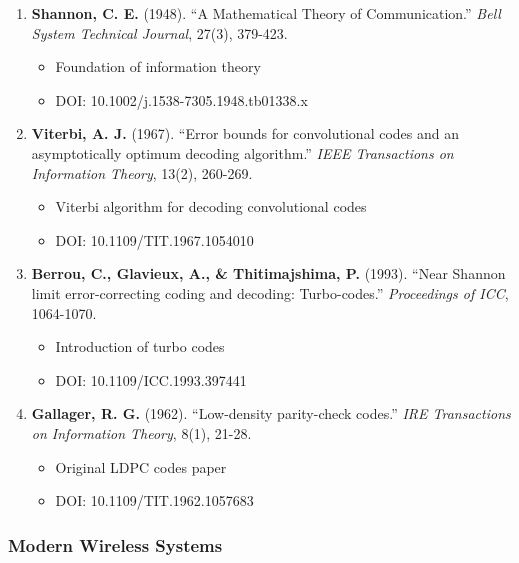 \begin{enumerate}
\def\labelenumi{\arabic{enumi}.}
\setcounter{enumi}{16}
\tightlist
\item
  \textbf{Shannon, C. E.} (1948). ``A Mathematical Theory of
  Communication.'' \emph{Bell System Technical Journal}, 27(3), 379-423.

  \begin{itemize}
  \tightlist
  \item
    Foundation of information theory
  \item
    DOI: 10.1002/j.1538-7305.1948.tb01338.x
  \end{itemize}
\item
  \textbf{Viterbi, A. J.} (1967). ``Error bounds for convolutional codes
  and an asymptotically optimum decoding algorithm.'' \emph{IEEE
  Transactions on Information Theory}, 13(2), 260-269.

  \begin{itemize}
  \tightlist
  \item
    Viterbi algorithm for decoding convolutional codes
  \item
    DOI: 10.1109/TIT.1967.1054010
  \end{itemize}
\item
  \textbf{Berrou, C., Glavieux, A., \& Thitimajshima, P.} (1993). ``Near
  Shannon limit error-correcting coding and decoding: Turbo-codes.''
  \emph{Proceedings of ICC}, 1064-1070.

  \begin{itemize}
  \tightlist
  \item
    Introduction of turbo codes
  \item
    DOI: 10.1109/ICC.1993.397441
  \end{itemize}
\item
  \textbf{Gallager, R. G.} (1962). ``Low-density parity-check codes.''
  \emph{IRE Transactions on Information Theory}, 8(1), 21-28.

  \begin{itemize}
  \tightlist
  \item
    Original LDPC codes paper
  \item
    DOI: 10.1109/TIT.1962.1057683
  \end{itemize}
\end{enumerate}

\subsubsection{Modern Wireless Systems}\label{modern-wireless-systems}


